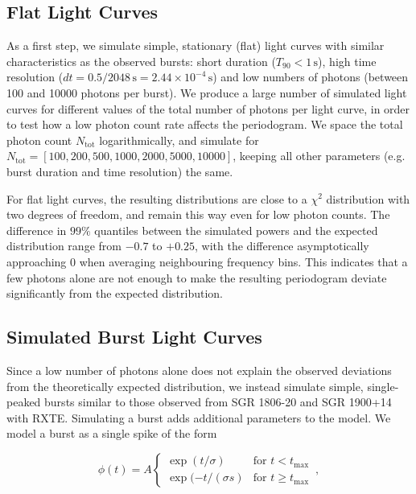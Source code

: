 \documentclass[numberedappendix]{emulateapj}
\begin{document}
\subsection{Flat Light Curves}
\label{sec:analysis_lcsims}
As a first step, we simulate simple, stationary (flat) light curves with similar characteristics as the observed bursts: short duration ($T_{90} < 1 \, \mathrm{s}$), high time resolution ($dt = 0.5/2048 \, \mathrm{s} = 2.44\times 10^{-4} \, \mathrm{s}$) and low numbers of photons (between 100 and 10000 photons per burst). 
We produce a large number of simulated light curves for different values of the total number of photons per light curve, in order to test how a low photon count rate affects the periodogram. We space the total photon count $N_{\mathrm{tot}}$ logarithmically, and simulate for $N_{\mathrm{tot}} = [100, 200, 500, 1000, 2000, 5000, 10000]$, keeping all other parameters (e.g. burst duration and time resolution) the same.

For flat light curves, the resulting distributions are close to a $\chi^2$ distribution with two degrees of freedom, and remain this way even for low photon counts. The difference in $99\%$ quantiles between the simulated powers and the expected distribution range from $-0.7$ to $+0.25$, with the difference asymptotically approaching $0$ when averaging neighbouring frequency bins.
This indicates that a few photons alone are not enough to make the resulting periodogram deviate significantly from the expected distribution.

\subsection{Simulated Burst Light Curves}
\label{sec:weakburstsims}
Since a low number of photons alone does not explain the observed deviations from the theoretically expected distribution, we instead simulate simple, single-peaked bursts similar to those observed from SGR 1806-20 and SGR 1900+14 with RXTE.
Simulating a burst adds additional parameters to the model. We model a burst as a single spike of the form

\begin{equation}
\phi(t) = A \left\{\begin{array}{ll}\exp(t/\sigma) & \mbox{for $t<t_\mathrm{max}$}\\ \exp(-t/(\sigma s) & \mbox{for $t\geq t_{\mathrm{max}}$}\end{array}\right. \, ,
\label{eqn:spikemodel}
\end{equation}
\end{document}
